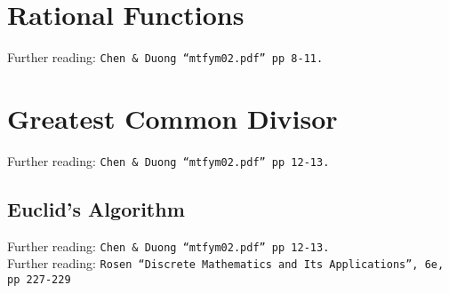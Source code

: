 \section{Rational Functions}
\label{sec:P Rational Functions}
Further reading: \texttt{Chen \& Duong ``mtfym02.pdf'' pp 8-11.}

\section{Greatest Common Divisor}
\label{sec:P Greatest Common Divisor}
Further reading: \texttt{Chen \& Duong ``mtfym02.pdf'' pp 12-13.}

\subsection{Euclid's Algorithm}
\label{sec:P Euclid's Algortihm}
Further reading: \texttt{Chen \& Duong ``mtfym02.pdf'' pp 12-13.}\\
Further reading: \texttt{Rosen ``Discrete Mathematics and Its Applications'', 6e, pp 227-229}